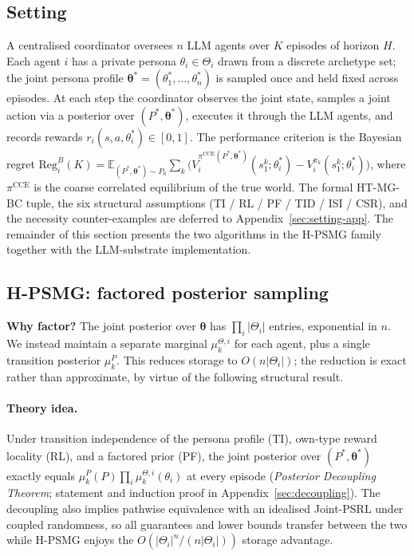 ﻿\documentclass{article}
\begin{document}
\subsection{Setting}
\label{sec:setting-main}

A centralised coordinator oversees $n$ LLM agents over $K$ episodes of horizon $H$. Each agent $i$ has a private persona $\theta_i \in \Theta_i$ drawn from a discrete archetype set; the joint persona profile $\boldsymbol\theta^*\!=\!(\theta_1^*,\ldots,\theta_n^*)$ is sampled once and held fixed across episodes. At each step the coordinator observes the joint state, samples a joint action via a posterior over $(P^*, \boldsymbol\theta^*)$, executes it through the LLM agents, and records rewards $r_i(s,a,\theta_i^*)\!\in\![0,1]$. The performance criterion is the Bayesian regret $\mathrm{Reg}_i^B(K)\!=\!\mathbb{E}_{(P^*,\boldsymbol\theta^*)\!\sim\!P_0}\!\sum_k\!\big(V_i^{\pi^{\mathrm{CCE}}(P^*\!,\boldsymbol\theta^*)}\!(s_1^k;\theta_i^*) - V_i^{\pi_k}(s_1^k;\theta_i^*)\big)$, where $\pi^{\mathrm{CCE}}$ is the coarse correlated equilibrium of the true world. The formal HT-MG-BC tuple, the six structural assumptions (TI / RL / PF / TID / ISI / CSR), and the necessity counter-examples are deferred to Appendix~\ref{sec:setting-app}. The remainder of this section presents the two algorithms in the H-PSMG family together with the LLM-substrate implementation.

\subsection{H-PSMG: factored posterior sampling}
\label{sec:hpsmg-vanilla}

\textbf{Why factor?} The joint posterior over $\boldsymbol\theta$ has $\prod_i|\Theta_i|$ entries, exponential in $n$. We instead maintain a separate marginal $\mu^{\Theta,i}_k$ for each agent, plus a single transition posterior $\mu^P_k$. This reduces storage to $O(n|\Theta_i|)$; the reduction is exact rather than approximate, by virtue of the following structural result.

\paragraph{Theory idea.} Under transition independence of the persona profile (TI), own-type reward locality (RL), and a factored prior (PF), the joint posterior over $(P^*, \boldsymbol\theta^*)$ exactly equals $\mu^P_k(P)\prod_i\mu^{\Theta,i}_k(\theta_i)$ at every episode (\emph{Posterior Decoupling Theorem}; statement and induction proof in Appendix~\ref{sec:decoupling}). The decoupling also implies pathwise equivalence with an idealised Joint-PSRL under coupled randomness, so all guarantees and lower bounds transfer between the two while H-PSMG enjoys the $O(|\Theta_i|^n/(n|\Theta_i|))$ storage advantage.
\end{document}

